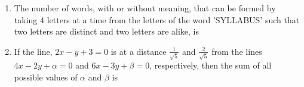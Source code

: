 \documentclass[journal]{IEEEtran}
\numberwithin{equation}{enumi}
\numberwithin{figure}{enumi}
\begin{document}
\begin{enumerate}
    \item The number of words, with or without meaning, that can be formed by taking 4 letters at a time from the letters of the word 'SYLLABUS' such that two letters are distinct and two letters are alike, is \\
    \item If the line, $2x-y+3=0$ is at a distance $\frac{1}{\sqrt{5}}$ and $\frac{2}{\sqrt{5}}$ from the lines $4x - 2y + \alpha =0$ and $6x - 3y + \beta =0$, respectively, then the sum of all possible values of $\alpha$ and $\beta$ is
\end{enumerate}
\end{document}
